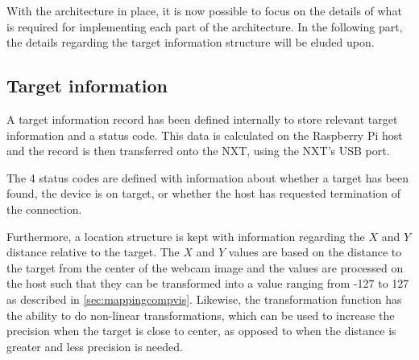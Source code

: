 With the architecture in place, it is now possible to focus on the details of what is required for implementing each part of the architecture.
In the following part, the details regarding the target information structure will be eluded upon.

\subsection{Target information}
A target information record has been defined internally to store relevant target information and a status code.
This data is calculated on the Raspberry Pi host and the record is then transferred onto the NXT, using the NXT's USB port.

The 4 status codes are defined with information about whether a target has been found, the device is on target, or whether the host has requested termination of the connection.

Furthermore, a location structure is kept with information regarding the $X$ and $Y$ distance relative to the target.
The $X$ and $Y$ values are based on the distance to the target from the center of the webcam image and the values are processed on the host such that they can be transformed into a value ranging from -127 to 127 as described in \autoref{sec:mappingcompvis}.
Likewise, the transformation function has the ability to do non-linear transformations, which can be used to increase the precision when the target is close to center, as opposed to when the distance is greater and less precision is needed.
